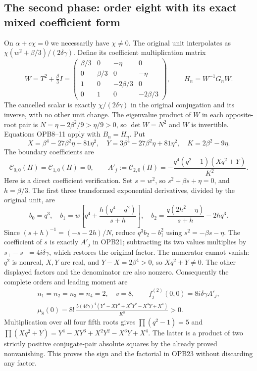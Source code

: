 \documentclass[11pt]{article}
\begin{document}
\subsection{The second phase: order eight with its exact mixed coefficient form}
On $\alpha+c\chi=0$ we necessarily have $\chi\ne0$. The original
unit interpolates as $\chi(w^2+\beta/3)/(2\delta\gamma)$.
Define its coefficient multiplication matrix
\[
 W=T^2+\tfrac\beta3 I=
 \begin{pmatrix}
 \beta/3&0&-\eta&0\\0&\beta/3&0&-\eta\\
 1&0&-2\beta/3&0\\0&1&0&-2\beta/3
 \end{pmatrix},\qquad H_n=W^{-1}G_nW.
 \tag{OPB19}
\]
The cancelled scalar is exactly $\chi/(2\delta\gamma)$ in the
original conjugation and its inverse, with no other unit change.
The eigenvalue product of $W$ in each opposite-root pair is
$N=\eta-2\beta^2/9>\eta/9>0$, so $\det W=N^2$ and $W$ is
invertible. Equations OPB8--11 apply with $B_n=H_n$.
Put
\[
 X=\beta^4-27\beta^2\eta+81\eta^2,\quad
 Y=3\beta^4-27\beta^2\eta+81\eta^2,\quad
 K=2\beta^2-9\eta.
 \tag{OPB20}
\]
The boundary coefficients are
\[
 \mathcal C_{0,0}(H)=\mathcal C_{1,0}(H)=0,\qquad
 A'_j:=\mathcal C_{2,0}(H)
 =-\frac{q^4(q^2-1)(Xq^2+Y)}{K^2}.
 \tag{OPB21}
\]
Here is a direct coefficient verification. Set $s=w^2$, so
$s^2+\beta s+\eta=0$, and $h=\beta/3$. The first three
transformed exponential derivatives, divided by the original unit, are
\[
 b_0=q^3,\quad
 b_1=w\left[q^4+\frac{h(q^4-q^2)}{s+h}\right],\quad
 b_2=\frac{q(2h^2-\eta)}{s+h}-2hq^3.
 \tag{OPB22}
\]
Since $(s+h)^{-1}=(-s-2h)/N$, reduce
$q^3b_2-b_1^2$ using $s^2=-\beta s-\eta$.
The coefficient of $s$ is exactly $A'_j$ in OPB21; subtracting its
two values multiplies by $s_+-s_-=4i\delta\gamma$, which restores
the original factor. The numerator cannot vanish: $q^2$ is nonreal,
$X,Y$ are real, and $Y-X=2\beta^4>0$, so $Xq^2+Y\ne0$.
The other displayed factors and the denominator are also nonzero.
Consequently the complete orders and leading moment are
\[
 \begin{gathered}
 n_1=n_2=n_3=n_4=2,\quad v=8,\qquad
 f_j^{(2)}(0,0)=8i\delta\gamma A'_j,\\
 \boxed{\mu_8(0)=8!\,
 \frac{5(4\delta\gamma)^4
 (Y^4-XY^3+X^2Y^2-X^3Y+X^4)}{K^8}>0.}
 \end{gathered}\tag{OPB23}
\]
Multiplication over all four fifth roots gives
$\prod(q^2-1)=5$ and
$\prod(Xq^2+Y)=Y^4-XY^3+X^2Y^2-X^3Y+X^4$.
The latter is a product of two strictly positive conjugate-pair
absolute squares by the already proved nonvanishing. This proves the
sign and the factorial in OPB23 without discarding any factor.
\end{document}
